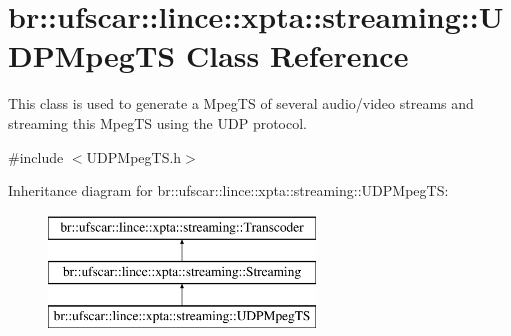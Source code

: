 \hypertarget{classbr_1_1ufscar_1_1lince_1_1xpta_1_1streaming_1_1UDPMpegTS}{
\section{br::ufscar::lince::xpta::streaming::UDPMpegTS Class Reference}
\label{classbr_1_1ufscar_1_1lince_1_1xpta_1_1streaming_1_1UDPMpegTS}
}


This class is used to generate a MpegTS of several audio/video streams and streaming this MpegTS using the UDP protocol.  




{\ttfamily \#include $<$UDPMpegTS.h$>$}

Inheritance diagram for br::ufscar::lince::xpta::streaming::UDPMpegTS:\begin{figure}[H]
\begin{center}
\leavevmode
\includegraphics[height=3cm]{classbr_1_1ufscar_1_1lince_1_1xpta_1_1streaming_1_1UDPMpegTS}
\end{center}
\end{figure}
